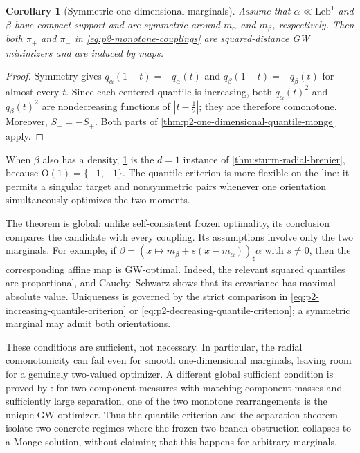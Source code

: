 \documentclass[11pt,a4paper]{article}
\newtheorem{corollary}[theorem]{Corollary}
\theoremstyle{definition}
\theoremstyle{remark}
\newcommand{\abs}[1]{\left\lvert #1\right\rvert}
\begin{document}
\begin{corollary}[Symmetric one-dimensional marginals]
\label{cor:p2-one-dimensional-symmetric-monge}
Assume that \(\alpha\ll\mathrm{Leb}^1\) and \(\beta\) have compact support
and are symmetric around \(m_\alpha\) and \(m_\beta\), respectively.  Then
both \(\pi_+\) and \(\pi_-\) in \eqref{eq:p2-monotone-couplings} are
squared-distance GW minimizers and are induced by maps.
\end{corollary}

\begin{proof}
Symmetry gives
\(
 q_\alpha(1-t)=-q_\alpha(t)
\)
and
\(
 q_\beta(1-t)=-q_\beta(t)
\)
for almost every \(t\).  Since each centered quantile is increasing, both
\(q_\alpha(t)^2\) and \(q_\beta(t)^2\) are nondecreasing functions of
\(\abs{t-\tfrac12}\); they are therefore comonotone.  Moreover,
\(S_-=-S_+\).  Both parts of
\cref{thm:p2-one-dimensional-quantile-monge} apply.
\end{proof}

When \(\beta\) also has a density,
\cref{cor:p2-one-dimensional-symmetric-monge} is the \(d=1\) instance of
\cref{thm:sturm-radial-brenier}, because
\(\mathrm O(1)=\{-1,+1\}\).  The quantile criterion is more flexible on the
line: it permits a singular target and nonsymmetric pairs whenever one
orientation simultaneously optimizes the two moments.

The theorem is global: unlike self-consistent frozen optimality, its
conclusion compares the candidate with every coupling.  Its assumptions
involve only the two marginals.  For example, if
\(
 \beta=(x\mapsto m_\beta+s(x-m_\alpha))_\sharp\alpha
\)
with \(s\ne0\), then the corresponding affine map is GW-optimal.  Indeed,
the relevant squared quantiles are proportional, and Cauchy--Schwarz shows
that its covariance has maximal absolute value.  Uniqueness is governed by
the strict comparison in
\eqref{eq:p2-increasing-quantile-criterion} or
\eqref{eq:p2-decreasing-quantile-criterion}; a symmetric marginal may admit
both orientations.

These conditions are sufficient, not necessary.  In particular, the radial
comonotonicity can fail even for smooth one-dimensional marginals, leaving
room for a genuinely two-valued optimizer.  A different global sufficient
condition is proved by \citet[Proposition~3.14]{DumontLacombeVialard2025}:
for two-component measures with matching component masses and sufficiently
large separation, one of the two monotone rearrangements is the unique GW
optimizer.  Thus the quantile criterion and the separation theorem isolate
two concrete regimes where the frozen two-branch obstruction collapses to a
Monge solution, without claiming that this happens for arbitrary marginals.
\end{document}
